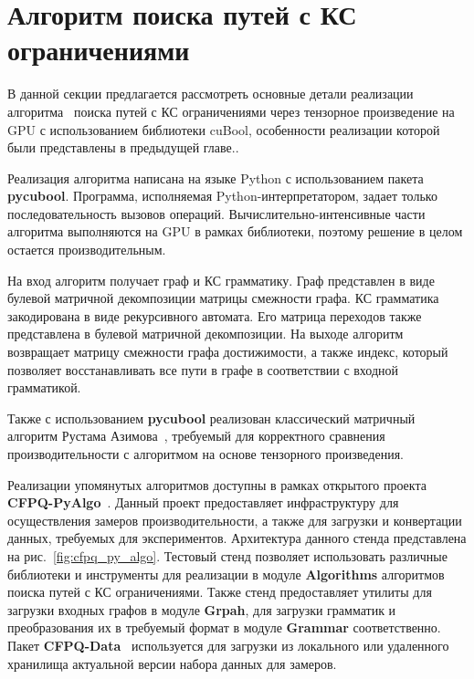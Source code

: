 \section{Алгоритм поиска путей с КС ограничениями}
\label{section:algo_impl}

В данной секции предлагается рассмотреть основные детали реализации алгоритма~\cite{inbook:kronecker_cfpq_adbis} поиска путей с КС ограничениями через тензорное произведение на GPU с использованием библиотеки cuBool, особенности реализации которой были представлены в предыдущей главе..

Реализация алгоритма написана на языке Python с использованием пакета \textbf{pycubool}.
Программа, исполняемая Python-интерпретатором, задает только последовательность вызовов операций.
Вычислительно-интенсивные части алгоритма выполняются на GPU в рамках библиотеки, 
поэтому решение в целом остается производительным.
 
На вход алгоритм получает граф и КС грамматику. 
Граф представлен в виде булевой матричной декомпозиции матрицы смежности графа.
КС грамматика закодирована в виде рекурсивного автомата. 
Его матрица переходов также представлена в булевой матричной декомпозиции.
На выходе алгоритм возвращает матрицу смежности графа достижимости, а также индекс, 
который позволяет восстанавливать все пути в графе в соответствии с входной грамматикой.

Также с использованием \textbf{pycubool} реализован классический матричный алгоритм Рустама Азимова~\cite{inproceedings:matrix_cfpq}, требуемый для корректного сравнения производительности с алгоритмом на основе тензорного произведения.

Реализации упомянутых алгоритмов доступны в рамках открытого проекта \textbf{CFPQ-PyAlgo}~\cite{net:cfpq_py_algo}.
Данный проект предоставляет инфраструктуру для осуществления замеров производительности, а также для загрузки и конвертации данных, требуемых для экспериментов.
Архитектура данного стенда представлена на рис.~\ref{fig:cfpq_py_algo}. 
Тестовый стенд позволяет использовать различные библиотеки и инструменты для реализации в модуле  \textbf{Algorithms} алгоритмов поиска путей с КС ограничениями. Также стенд предоставляет утилиты для загрузки входных графов в модуле \textbf{Grpah}, для загрузки грамматик и преобразования их в требуемый формат в модуле \textbf{Grammar} соответственно.
Пакет \textbf{CFPQ-Data}~\cite{net:cfpq_data} используется для загрузки из локального или удаленного хранилища актуальной версии набора данных для замеров.

